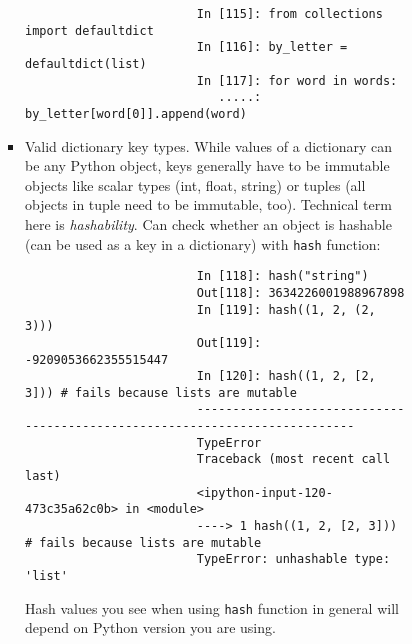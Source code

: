\documentclass{article}
\begin{document}
\begin{enumerate}
\begin{itemize}
\begin{itemize}
\begin{itemize}
\begin{itemize}
\begin{verbatim}
						In [115]: from collections import defaultdict
						In [116]: by_letter = defaultdict(list)
						In [117]: for word in words:
						   .....:     by_letter[word[0]].append(word)
					\end{verbatim}
					\item {\sf Valid dictionary key types.} While values of a dictionary can be any Python object, keys generally have to be immutable objects like scalar types (int, float, string) or tuples (all objects in tuple need to be immutable, too). Technical term here is {\it hashability}. Can check whether an object is hashable (can be used as a key in a dictionary) with {\tt hash} function:
					\begin{verbatim}
						In [118]: hash("string")
						Out[118]: 3634226001988967898
						In [119]: hash((1, 2, (2, 3)))
						Out[119]: -9209053662355515447
						In [120]: hash((1, 2, [2, 3])) # fails because lists are mutable
						---------------------------------------------------------------------------
						TypeError
						Traceback (most recent call last)
						<ipython-input-120-473c35a62c0b> in <module>
						----> 1 hash((1, 2, [2, 3])) # fails because lists are mutable
						TypeError: unhashable type: 'list'
					\end{verbatim}
					Hash values you see when using {\tt hash} function in general will depend on Python version you are using.
					

\end{itemize}
\end{itemize}
\end{itemize}
\end{itemize}
\end{enumerate}
\end{document}
